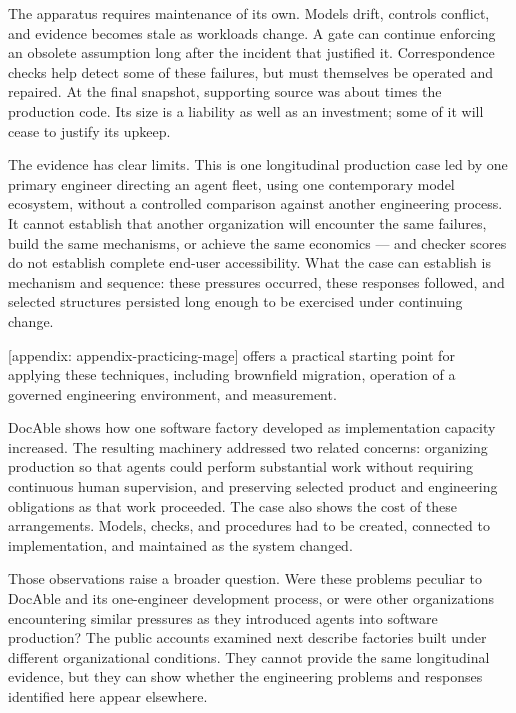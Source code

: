 
The apparatus requires maintenance of its own. Models drift, controls conflict, and evidence becomes stale as workloads change. A gate can continue enforcing an obsolete assumption long after the incident that justified it. Correspondence checks help detect some of these failures, but must themselves be operated and repaired. At the final snapshot, supporting source was about  times the production code. Its size is a liability as well as an investment; some of it will cease to justify its upkeep.


The evidence has clear limits. This is one longitudinal production case led by one primary engineer directing an agent fleet, using one contemporary model ecosystem, without a controlled comparison against another engineering process. It cannot establish that another organization will encounter the same failures, build the same mechanisms, or achieve the same economics --- and checker scores do not establish complete end-user accessibility. What the case can establish is mechanism and sequence: these pressures occurred, these responses followed, and selected structures persisted long enough to be exercised under continuing change.

{[}appendix: appendix-practicing-mage{]} offers a practical starting point for applying these techniques, including brownfield migration, operation of a governed engineering environment, and measurement.


DocAble shows how one software factory developed as implementation capacity increased. The resulting machinery addressed two related concerns: organizing production so that agents could perform substantial work without requiring continuous human supervision, and preserving selected product and engineering obligations as that work proceeded. The case also shows the cost of these arrangements. Models, checks, and procedures had to be created, connected to implementation, and maintained as the system changed.

Those observations raise a broader question. Were these problems peculiar to DocAble and its one-engineer development process, or were other organizations encountering similar pressures as they introduced agents into software production? The public accounts examined next describe factories built under different organizational conditions. They cannot provide the same longitudinal evidence, but they can show whether the engineering problems and responses identified here appear elsewhere.
